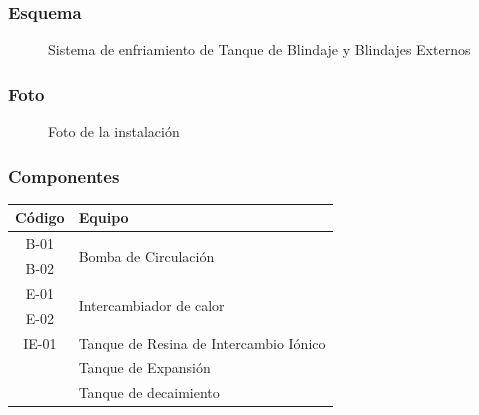 \documentclass{article}
\begin{document}
\subsubsection*{Esquema}
\begin{figure}[H]
\begin{center}
\end{center}
\caption{Sistema de enfriamiento de Tanque de Blindaje y Blindajes Externos}
\end{figure}
\subsubsection*{Foto}
\begin{figure}[H]
\begin{center}
\end{center}
\caption{Foto de la instalación}
\end{figure}
\subsubsection*{Componentes}
\begin{table}[H]
\centering
\begin{tabular}{cp{4cm}}
\toprule
Código & Equipo \\
\midrule
B-01 & \multirow{2}{*}{Bomba de Circulación} \\
B-02 & \\
\midrule
E-01 & \multirow{2}{*}{Intercambiador de calor} \\
E-02 & \\
\midrule
IE-01 & Tanque de Resina de \newline Intercambio Iónico \\
\midrule
& Tanque de Expansión \\
\midrule
& Tanque de decaimiento \\
\bottomrule
\end{tabular}
\end{table}
\end{document}
